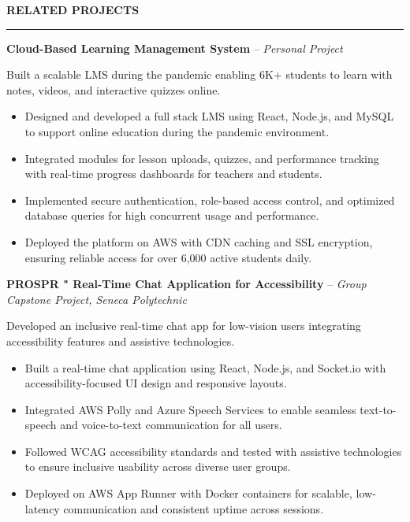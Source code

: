 \documentclass[10pt,letterpaper]{article}
\begin{document}
\vspace{6pt}

\textbf{RELATED PROJECTS}\\[-8pt]
\noindent\rule{\textwidth}{1pt}

\vspace{-2pt}

\textbf{Cloud-Based Learning Management System} -- \emph{Personal Project}

\vspace{-1pt}

Built a scalable LMS during the pandemic enabling 6K+ students to learn with notes, videos, and interactive quizzes online.
\vspace{-1pt}
\begin{itemize}
\item Designed and developed a full stack LMS using React, Node.js, and MySQL to support online education during the pandemic environment.
\item Integrated modules for lesson uploads, quizzes, and performance tracking with real-time progress dashboards for teachers and students.
\item Implemented secure authentication, role-based access control, and optimized database queries for high concurrent usage and performance.
\item Deployed the platform on AWS with CDN caching and SSL encryption, ensuring reliable access for over 6,000 active students daily.
\end{itemize}

\textbf{PROSPR " Real-Time Chat Application for Accessibility} -- \emph{Group Capstone Project, Seneca Polytechnic}

\vspace{-1pt}

Developed an inclusive real-time chat app for low-vision users integrating accessibility features and assistive technologies.
\vspace{-1pt}
\begin{itemize}
\item Built a real-time chat application using React, Node.js, and Socket.io with accessibility-focused UI design and responsive layouts.
\item Integrated AWS Polly and Azure Speech Services to enable seamless text-to-speech and voice-to-text communication for all users.
\item Followed WCAG accessibility standards and tested with assistive technologies to ensure inclusive usability across diverse user groups.
\item Deployed on AWS App Runner with Docker containers for scalable, low-latency communication and consistent uptime across sessions.
\end{itemize}
\end{document}
